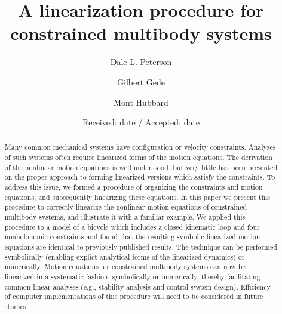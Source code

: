 \documentclass[smallcondensed]{svjour3}                     %
\begin{document}
\title{A linearization procedure for constrained multibody systems}


\author{Dale L. Peterson\and Gilbert Gede\and Mont Hubbard}


\date{Received: date / Accepted: date}

\maketitle

\begin{abstract}
Many common mechanical systems have configuration or velocity constraints.
Analyses of such systems often require linearized forms of the motion
equations.  The derivation of the nonlinear motion equations is well
understood, but very little has been presented on the proper approach to
forming linearized versions which satisfy the constraints.
To address this issue, we formed a procedure of organizing the constraints
and motion equations, and subsequently linearizing these equations.
In this paper we present this procedure to correctly linearize the nonlinear
motion equations of constrained multibody systems, and illustrate it with a
familiar example.
We applied this procedure to a model of a bicycle which includes a closed
kinematic loop and four nonholonomic constraints and found that the resulting
symbolic linearized motion equations are identical to previously published
results.  The technique can be performed symbolically (enabling explict
analytical forms of the linearized dynamics) or numerically.
Motion equations for constrained multibody systems can now be linearized in a
systematic fashion, symbolically or numerically, thereby facilitating common
linear analyses (e.g., stability analysis and control system design).
Efficiency of computer implementations of this procedure will need to be
considered in future studies.
\end{abstract}
\end{document}
